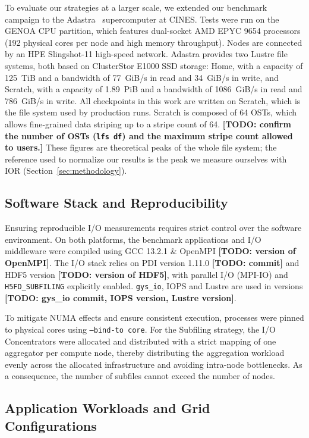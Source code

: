 To evaluate our strategies at a larger scale, we extended our benchmark campaign to the
Adastra~\cite{adastra_cines} supercomputer at CINES. Tests were run on the GENOA CPU partition,
which features dual-socket AMD EPYC 9654 processors (192 physical cores per node and high memory
throughput). Nodes are connected by an HPE Slingshot-11 high-speed network. Adastra provides two
Lustre file systems, both based on ClusterStor E1000 SSD storage: Home, with a capacity of
125~TiB and a bandwidth of 77~GiB/s in read and 34~GiB/s in write, and Scratch, with a capacity of
1.89~PiB and a bandwidth of 1086~GiB/s in read and 786~GiB/s in write. All checkpoints in this
work are written on Scratch, which is the file system used by production runs. Scratch is
composed of 64 OSTs, which allows fine-grained data striping up to a stripe count of 64.
\textbf{[TODO: confirm the number of OSTs (\texttt{lfs df}) and the maximum stripe count allowed to
users.]}
These figures are theoretical peaks of the whole file system; the reference used to normalize our
results is the peak we measure ourselves with IOR (Section~\ref{sec:methodology}).

\subsection{Software Stack and Reproducibility}
\label{sec:repro}

Ensuring reproducible I/O measurements requires strict control over the software environment.
On both platforms, the benchmark applications and I/O middleware were compiled using GCC 13.2.1 \&
OpenMPI \textbf{[TODO: version of OpenMPI]}. The I/O stack relies on PDI version 1.11.0
\textbf{[TODO: commit]} and HDF5 version \textbf{[TODO: version of HDF5]}, with parallel I/O
(MPI-IO) and \texttt{H5FD\_SUBFILING} explicitly enabled. \texttt{gys\_io}, IOPS and Lustre are used
in versions \textbf{[TODO: gys\_io commit, IOPS version, Lustre version]}.

To mitigate NUMA effects and ensure consistent execution, processes were pinned to physical cores
using \texttt{--bind-to core}. For the Subfiling strategy, the I/O Concentrators were allocated and
distributed with a strict mapping of one aggregator per compute node, thereby distributing the
aggregation workload evenly across the allocated infrastructure and avoiding intra-node
bottlenecks. As a consequence, the number of subfiles cannot exceed the number of nodes.

\subsection{Application Workloads and Grid Configurations}
\label{sec:workloads}

